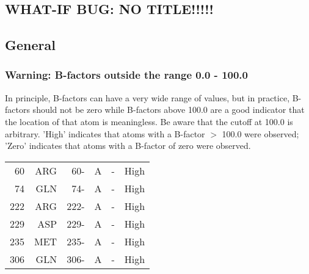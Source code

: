 \documentclass[a4paper]{article}
\def\showsect#1{
  \thesect\gdef\thesect{}
  \thessect\gdef\thessect{}
  \subsubsection{#1}
}
\gdef\thesect{\pagebreak[2]\section{WHAT-IF BUG: NO TITLE!!!!!}}
\gdef\thessect{\subsection{General}}
\begin{document}
\begin{warning}
\showsect{Warning: B-factors outside the range 0.0 - 100.0}
In principle, B-factors can have a very wide range of values, but in
practice, B-factors should not be zero while B-factors above 100.0
are a good indicator that the location of that atom is meaningless. Be
aware that the cutoff at 100.0 is arbitrary. 'High' indicates that atoms
with a B-factor $>$ 100.0 were observed; 'Zero' indicates that atoms with
a B-factor of zero were observed.
 
\begin{center}
 
\begin{supertabular}{rr@{ (}r@{) }rll}
   60&ARG &  60-&A &- & High\\
   74&GLN &  74-&A &- & High\\
  222&ARG & 222-&A &- & High\\
  229&ASP & 229-&A &- & High\\
  235&MET & 235-&A &- & High\\
  306&GLN & 306-&A &- & High\\
\end{supertabular}\end{center}
\end{warning}
\end{document}
